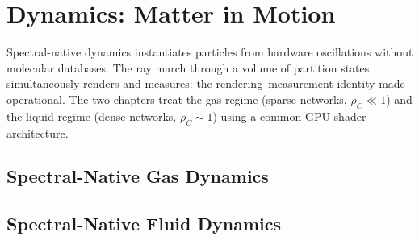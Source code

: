 \documentclass[12pt,a4paper,twoside,openright]{book}
\theoremstyle{plain}
\theoremstyle{definition}
\theoremstyle{remark}
\begin{document}
\part{Dynamics: Matter in Motion}
\label{part:dynamics}

\noindent
Spectral-native dynamics instantiates particles from hardware oscillations
without molecular databases.
The ray march through a volume of partition states simultaneously renders
and measures: the rendering--measurement identity made operational.
The two chapters treat the gas regime (sparse networks, $\rho_C \ll 1$)
and the liquid regime (dense networks, $\rho_C \sim 1$) using a common
GPU shader architecture.

\chapter{Spectral-Native Gas Dynamics}
\label{ch:gasdynamics}


\chapter{Spectral-Native Fluid Dynamics}
\label{ch:fluiddynamics}


\backmatter


\end{document}
